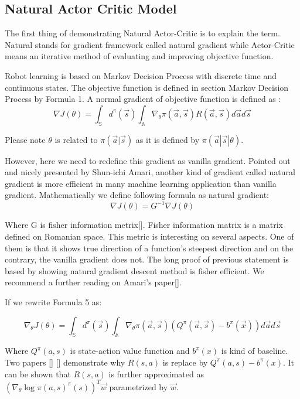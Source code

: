 \documentclass[officiallayout]{tktla}
\begin{document}
\subsection{Natural Actor Critic Model}
The first thing of demonstrating Natural Actor-Critic is to explain the term. Natural
stands for gradient framework called natural gradient while Actor-Critic means an
iterative method of evaluating and improving objective function.

Robot learning is based on Markov Decision Process with discrete time and continuous
states. The objective function is defined in section Markov Decision Process
by Formula 1. A normal gradient of objective function is defined as :
\begin{equation}
\nabla J(\theta) = \int_\mathbb{S} d^\pi(\vec{s})\int_\mathbb{A}\nabla_\theta \pi(\vec{a}, \vec{s})R(\vec{a}, \vec{s})d\vec{a}d\vec{s}
\label{objective_function}
\end{equation}


Please note $\theta$ is related to $\pi(\vec{a}|\vec{s})$ as it is defined by $\pi(\vec{a}|\vec{s}|\theta)$.

However, here we need to redefine this gradient as vanilla gradient. Pointed out
and nicely presented by Shun-ichi Amari, another kind of gradient called natural
gradient is more efficient in many machine learning application than vanilla gradient.
Mathematically we define following formula as natural gradient:
\begin{equation}
\nabla J(\theta) = G^{-1}\nabla J(\theta)
\end{equation}

Where G is fisher information metrix[].
Fisher information matrix is a matrix defined on Romanian space. This metric
is interesting on several aspects. One of them is that it shows true direction of
a function's steepest direction and on the contrary, the vanilla gradient does not.
The long proof of previous statement is based by showing natural gradient descent
method is fisher efficient. We recommend a further reading on Amari's paper[].

If we rewrite Formula 5 as:

\begin{equation}
\nabla_\theta J(\theta) = \int_\mathbb{S} d^\pi(\vec{s})\int_\mathbb{A}\nabla_\theta \pi(\vec{a}, \vec{s})(Q^\pi(\vec{a}, \vec{s}) -b^\pi(\vec{x}))d\vec{a}d\vec{s}
\end{equation}



Where $Q^\pi(a, s)$ is state-action value function and $b^\pi(x)$ is kind of baseline. Two
papers [] [] demonstrate why $R(s, a)$ is replace by $Q^\pi(a, s) - b^\pi(x)$. It can be
shown that $R(s, a)$ is further approximated as $(\nabla_\theta \log\pi(a,s)^\pi(s))^T \vec{w}$ parametrized by $\vec{w}$.
\end{document}
